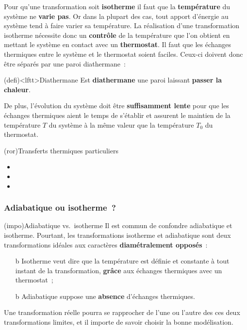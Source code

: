 \documentclass[../../main/main.tex]{subfiles}
\begin{document}
Pour qu'une transformation soit \textbf{isotherme} il faut que la
\textbf{température} du système ne \textbf{varie pas}. Or dans la plupart des
cas, tout
apport d'énergie au système tend à faire varier sa température.
\bigbreak
La réalisation d'une transformation isotherme nécessite donc un
\textbf{contrôle} de la température que l'on obtient en mettant le système en
contact avec un \textbf{thermostat}. Il faut que les échanges thermiques entre
le système et le thermostat soient faciles. Ceux-ci doivent donc être séparés
par une paroi diathermane~:
\begin{tcb}(defi)<lftt>{Diathermane}
	Est \textbf{diathermane} une paroi laissant \textbf{passer la chaleur}.
\end{tcb}
De plus, l'évolution du système doit être \textbf{suffisamment lente} pour que
les échanges thermiques aient le temps de s'établir et assurent le maintien de
la température $T$ du système à la même valeur que la température $T_0$ du
thermostat.

\begin{tcb*}(ror){Transferts thermiques particuliers}
	\begin{itemize}
		\item {}
		\item {}
		\item {}
	\end{itemize}
\end{tcb*}

\subsubsection{Adiabatique ou isotherme~?}

\begin{tcb*}(impo){Adiabatique vs.\ isotherme}
	Il est commun de confondre adiabatique et isotherme. Pourtant, les
	transformations isotherme et adiabatique sont deux transformations idéales aux
	caractères \textbf{diamétralement opposés}~:
	\begin{itemize}
		\item[b]{Isotherme} veut dire que la température est définie et constante à
		tout instant de la transformation, \textbf{grâce} aux échanges thermiques
		avec un thermostat~;
		\item[b]{Adiabatique} suppose une \textbf{absence} d'échanges thermiques.
	\end{itemize}
\end{tcb*}
Une transformation réelle pourra se rapprocher de l'une ou l'autre des ces deux
transformations limites, et il importe de savoir choisir la bonne modélisation.
\end{document}
